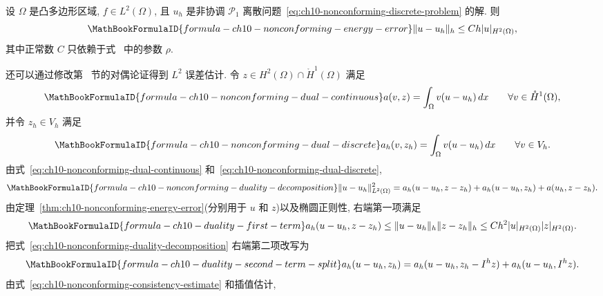 \begin{Theorem}
\label{thm:ch10-nonconforming-energy-error}
设 $\Omega$ 是凸多边形区域, $f\in L^2(\Omega)$, 且 $u_h$ 是非协调 $\mathcal P_1$ 离散问题~\eqref{eq:ch10-nonconforming-discrete-problem} 的解. 则
\[
\MathBookFormulaID{formula-ch10-nonconforming-energy-error}
\|u-u_h\|_h\leq Ch|u|_{H^2(\Omega)},
\]
其中正常数 $C$ 只依赖于式~ 中的参数 $\rho$.
\end{Theorem}

还可以通过修改第~ 节的对偶论证得到 $L^2$ 误差估计. 令 $z\in H^2(\Omega)\cap\mathring H^1(\Omega)$ 满足
\begin{equation}
\MathBookFormulaID{formula-ch10-nonconforming-dual-continuous}
\label{eq:ch10-nonconforming-dual-continuous}
a(v,z)=\int_\Omega v(u-u_h)\,dx
\qquad\forall v\in\mathring H^1(\Omega),
\end{equation}
并令 $z_h\in V_h$ 满足
\begin{equation}
\MathBookFormulaID{formula-ch10-nonconforming-dual-discrete}
\label{eq:ch10-nonconforming-dual-discrete}
a_h(v,z_h)=\int_\Omega v(u-u_h)\,dx
\qquad\forall v\in V_h.
\end{equation}
由式~\eqref{eq:ch10-nonconforming-dual-continuous} 和~\eqref{eq:ch10-nonconforming-dual-discrete},
\begin{equation}
\MathBookFormulaID{formula-ch10-nonconforming-duality-decomposition}
\label{eq:ch10-nonconforming-duality-decomposition}
\|u-u_h\|_{L^2(\Omega)}^2
=a_h(u-u_h,z-z_h)+a_h(u-u_h,z_h)+a(u_h,z-z_h).
\end{equation}
由定理~\ref{thm:ch10-nonconforming-energy-error}(分别用于 $u$ 和 $z$)以及椭圆正则性, 右端第一项满足
\begin{equation}
\MathBookFormulaID{formula-ch10-duality-first-term}
\label{eq:ch10-duality-first-term}
a_h(u-u_h,z-z_h)\leq\|u-u_h\|_h\|z-z_h\|_h
\leq Ch^2|u|_{H^2(\Omega)}|z|_{H^2(\Omega)}.
\end{equation}
把式~\eqref{eq:ch10-nonconforming-duality-decomposition} 右端第二项改写为
\begin{equation}
\MathBookFormulaID{formula-ch10-duality-second-term-split}
\label{eq:ch10-duality-second-term-split}
a_h(u-u_h,z_h)=a_h(u-u_h,z_h-I^hz)+a_h(u-u_h,I^hz).
\end{equation}
由式~\eqref{eq:ch10-nonconforming-consistency-estimate} 和插值估计,
